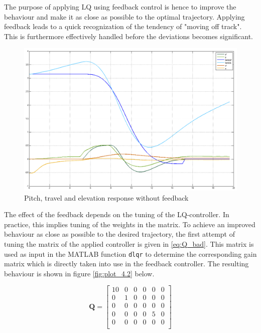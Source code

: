 \documentclass[a4paper, 12pt]{article}\usepackage[utf8]{inputenc}
\begin{document}
 The purpose of applying LQ using feedback control is hence to improve the behaviour and make it as close as possible to the optimal trajectory. Applying feedback leads to a quick recognization of the tendency of "moving off track". This is furthermore effectively handled before the deviations becomes significant. 



\begin{figure}[H]
    \centering
    \includegraphics[width=150mm]{Part4/without_feedback_bad_tuning.PNG}
    \caption{Pitch, travel and elevation response without feedback}
    \label{fig:plot_4.1}
\end{figure}

 The effect of the feedback depends on the tuning of the LQ-controller. In practice, this implies tuning of the weights in the  matrix. To achieve an improved behaviour as close as possible to the desired trajectory, the first attempt of tuning the  matrix of the applied controller is given in \ref{eq:Q_bad}. This matrix is used as input in the MATLAB function \texttt{dlqr} to determine the corresponding gain matrix  which is directly taken into use in the feedback controller. The resulting behaviour is shown in figure \ref{fig:plot_4.2} below. 

\begin{equation}
    \label{eq:Q_bad}
    \boldsymbol{Q} = 
    \begin{bmatrix}
        10 & 0 & 0 & 0 & 0 & 0 \\
        0 & 1 & 0 & 0 & 0 & 0 \\
        0 & 0 & 0 & 0 & 0 & 0 \\
        0 & 0 & 0 & 0 & 5 & 0 \\
        0 & 0 & 0 & 0 & 0 & 0 \\
    \end{bmatrix}
\end{equation}
\end{document}
